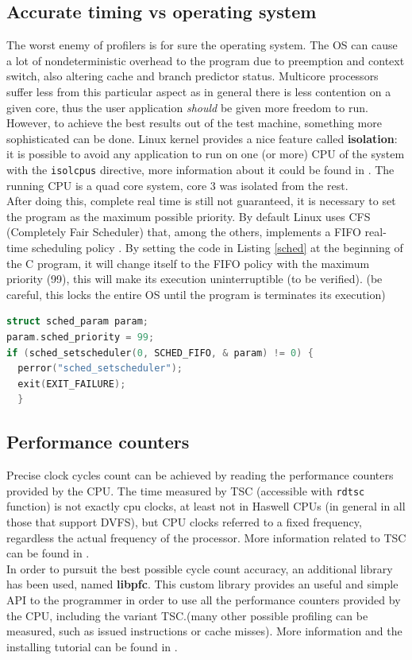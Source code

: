 \documentclass[a4paper]{article}
\begin{document}
\subsection{Accurate timing vs operating system}
The worst enemy of profilers is for sure the operating system. The OS can cause a lot of nondeterministic overhead to the program due to preemption and context switch, also altering cache and branch predictor status. Multicore processors suffer less from this particular aspect as in general there is less contention on a given core, thus the user application \textit{should} be given more freedom to run.
\\However, to achieve the best results out of the test machine, something more sophisticated can be done.
Linux kernel provides a nice feature called \textbf{isolation}: it is possible to avoid any application to run on one (or more) CPU of the system with the \lstinline[language=c, basicstyle=\ttfamily]{isolcpus} directive, more information about it could be found in \autocite{ISOLCPU}.
The running CPU is a quad core system, core 3 was isolated from the rest.
\\ After doing this, complete real time is still not guaranteed, it is necessary to set the program as the maximum possible priority. By default Linux uses CFS (Completely Fair Scheduler) that, among the others, implements a FIFO real-time scheduling policy \autocite{SCHEDU}. 
By setting the code in Listing \ref{sched} at the beginning of the C program, it will change itself to the FIFO policy with the maximum priority (99), this will make its execution uninterruptible (to be verified). (be careful, this locks the entire OS until the program is terminates its execution)

\begin{lstlisting}[language=c,frame=tb,caption=Scheduler Policy Change,label=sched]
struct sched_param param;
param.sched_priority = 99;
if (sched_setscheduler(0, SCHED_FIFO, & param) != 0) {
  perror("sched_setscheduler");
  exit(EXIT_FAILURE);  
  }
\end{lstlisting}

\subsection{Performance counters}
Precise clock cycles count can be achieved by reading the performance counters provided by the CPU. The time measured by TSC (accessible with \lstinline[language=c, basicstyle=\ttfamily]{rdtsc} function) is not exactly cpu clocks, at least not in Haswell CPUs (in general in all those that support DVFS), but CPU clocks referred to a fixed frequency, regardless the actual frequency of the processor. More information related to TSC can be found in \autocite{TSC}.
\\In order to pursuit the best possible cycle count accuracy, an additional library has been used, named \textbf{libpfc}. This custom library provides an useful and simple API to the programmer in order to use all the performance counters provided by the CPU, including the variant TSC.(many other possible profiling can be measured, such as issued instructions or cache misses). More information and the installing tutorial can be found in \autocite{LIBPFC}.
\end{document}
